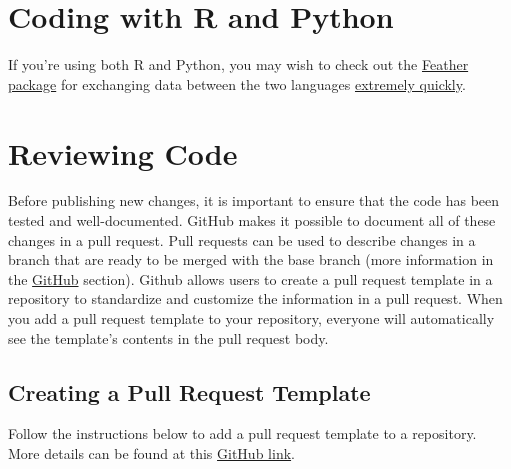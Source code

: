 \documentclass[]{book}
\begin{document}
\section{Coding with R and Python}\label{coding-with-r-and-python}

If you're using both R and Python, you may wish to check out the
\href{https://www.rdocumentation.org/packages/feather/versions/0.3.3}{Feather
package} for exchanging data between the two languages
\href{https://blog.rstudio.com/2016/03/29/feather/}{extremely quickly}.

\section{Reviewing Code}\label{reviewing-code}

Before publishing new changes, it is important to ensure that the code
has been tested and well-documented. GitHub makes it possible to
document all of these changes in a pull request. Pull requests can be
used to describe changes in a branch that are ready to be merged with
the base branch (more information in the
\protect\hyperlink{Github}{GitHub} section). Github allows users to
create a pull request template in a repository to standardize and
customize the information in a pull request. When you add a pull request
template to your repository, everyone will automatically see the
template's contents in the pull request body.

\subsection{Creating a Pull Request
Template}\label{creating-a-pull-request-template}

Follow the instructions below to add a pull request template to a
repository. More details can be found at this
\href{https://help.github.com/en/github/building-a-strong-community/creating-a-pull-request-template-for-your-repository}{GitHub
link}.
\end{document}
